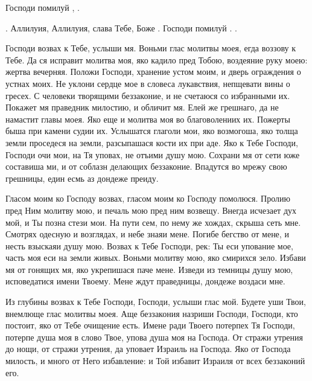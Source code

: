 \begin{mymulticols}
Господи помилуй , . 

 . Аллилуия, Аллилуия, слава Тебе, Боже . Господи помилуй . .




Господи возвах к Тебе, услыши мя. Воньми глас молитвы моея, егда воззову к Тебе. Да ся исправит молитва моя, яко кадило пред Тобою, воздеяние руку моею: жертва вечерняя. Положи Господи, хранение устом моим, и дверь ограждения о устнах моих. Не уклони сердце мое в словеса лукавствия, непщевати вины о гресех. С человеки творящими беззаконие, и не счетаюся со избранными их. Покажет мя праведник милостию, и обличит мя. Елей же грешнаго, да не намастит главы моея. Яко еще и молитва моя во благоволениих их. Пожерты быша при камени судии их. Услышатся глаголи мои, яко возмогоша, яко толща земли проседеся на земли, разсыпашася кости их при аде. Яко к Тебе Господи, Господи очи мои, на Тя уповах, не отъими душу мою. Сохрани мя от сети юже составиша ми, и от соблазн делающих беззаконие. Впадутся во мрежу свою грешницы, един есмь аз дондеже преиду.




Гласом моим ко Господу возвах, гласом моим ко Господу помолюся. Пролию пред Ним молитву мою, и печаль мою пред ним возвещу. Внегда исчезает дух мой, и Ты позна стези мои. На пути сем, по нему же хождах, скрыша сеть мне. Смотрях одесную и возглядах, и небе знаяи мене. Погибе бегство от мене, и несть взыскаяи душу мою. Возвах к Тебе Господи, рек: Ты еси упование мое, часть моя еси на земли живых. Воньми молитву мою, яко смирихся зело. Избави мя от гонящих мя, яко укрепишася паче мене. Изведи из темницы душу мою, исповедатися имени Твоему. Мене ждут праведницы, дондеже воздаси мне.




Из глубины возвах к Тебе Господи, Господи, услыши глас мой. Будете уши Твои, внемлюще глас молитвы моея. Аще беззакония назриши Господи, Господи, кто постоит, яко от Тебе очищение есть. Имене ради Твоего потерпех Тя Господи, потерпе душа моя в слово Твое, упова душа моя на Господа. От стражи утрения до нощи, от стражи утрения, да уповает Израиль на Господа. Яко от Господа милость, и много от Него избавление: и Той избавит Израиля от всех беззаконий его.





\end{mymulticols}
